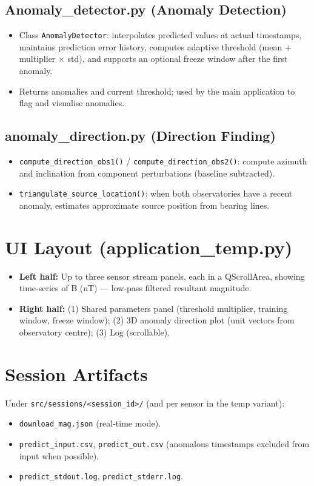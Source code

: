 \subsection{Anomaly\_detector.py (Anomaly Detection)}
\begin{itemize}
    \item Class \texttt{AnomalyDetector}: interpolates predicted values at actual timestamps, maintains prediction error history, computes adaptive threshold (mean + multiplier $\times$ std), and supports an optional freeze window after the first anomaly.
    \item Returns anomalies and current threshold; used by the main application to flag and visualise anomalies.
\end{itemize}

\subsection{anomaly\_direction.py (Direction Finding)}
\begin{itemize}
    \item \texttt{compute\_direction\_obs1()} / \texttt{compute\_direction\_obs2()}: compute azimuth and inclination from component perturbations (baseline subtracted).
    \item \texttt{triangulate\_source\_location()}: when both observatories have a recent anomaly, estimates approximate source position from bearing lines.
\end{itemize}

\section{UI Layout (application\_temp.py)}
\begin{itemize}
    \item \textbf{Left half:} Up to three sensor stream panels, each in a QScrollArea, showing time-series of B (nT) --- low-pass filtered resultant magnitude.
    \item \textbf{Right half:} (1) Shared parameters panel (threshold multiplier, training window, freeze window); (2) 3D anomaly direction plot (unit vectors from observatory centre); (3) Log (scrollable).
\end{itemize}

\section{Session Artifacts}
Under \texttt{src/sessions/<session\_id>/} (and per sensor in the temp variant):
\begin{itemize}
    \item \texttt{download\_mag.json} (real-time mode).
    \item \texttt{predict\_input.csv}, \texttt{predict\_out.csv} (anomalous timestamps excluded from input when possible).
    \item \texttt{predict\_stdout.log}, \texttt{predict\_stderr.log}.
\end{itemize}

